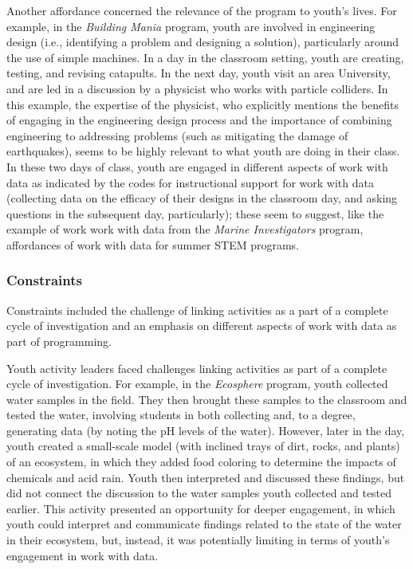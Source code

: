 \documentclass[]{msu-thesis}
\theoremstyle{definition}
\theoremstyle{definition}
\theoremstyle{definition}
\theoremstyle{remark}
\begin{document}
Another affordance concerned the relevance of the program to youth's
lives. For example, in the \emph{Building Mania} program, youth are
involved in engineering design (i.e., identifying a problem and
designing a solution), particularly around the use of simple machines.
In a day in the classroom setting, youth are creating, testing, and
revising catapults. In the next day, youth visit an area University, and
are led in a discussion by a physicist who works with particle
colliders. In this example, the expertise of the physicist, who
explicitly mentions the benefits of engaging in the engineering design
process and the importance of combining engineering to addressing
problems (such as mitigating the damage of earthquakes), seems to be
highly relevant to what youth are doing in their class. In these two
days of class, youth are engaged in different aspects of work with data
as indicated by the codes for instructional support for work with data
(collecting data on the efficacy of their designs in the classroom day,
and asking questions in the subsequent day, particularly); these seem to
suggest, like the example of work work with data from the \emph{Marine
Investigators} program, affordances of work with data for summer STEM
programs.

\subsubsection{Constraints}\label{constraints}

Constraints included the challenge of linking activities as a part of a
complete cycle of investigation and an emphasis on different aspects of
work with data as part of programming.

Youth activity leaders faced challenges linking activities as part of a
complete cycle of investigation. For example, in the \emph{Ecosphere}
program, youth collected water samples in the field. They then brought
these samples to the classroom and tested the water, involving students
in both collecting and, to a degree, generating data (by noting the pH
levels of the water). However, later in the day, youth created a
small-scale model (with inclined trays of dirt, rocks, and plants) of an
ecosystem, in which they added food coloring to determine the impacts of
chemicals and acid rain. Youth then interpreted and discussed these
findings, but did not connect the discussion to the water samples youth
collected and tested earlier. This activity presented an opportunity for
deeper engagement, in which youth could interpret and communicate
findings related to the state of the water in their ecosystem, but,
instead, it was potentially limiting in terms of youth's engagement in
work with data.
\end{document}
